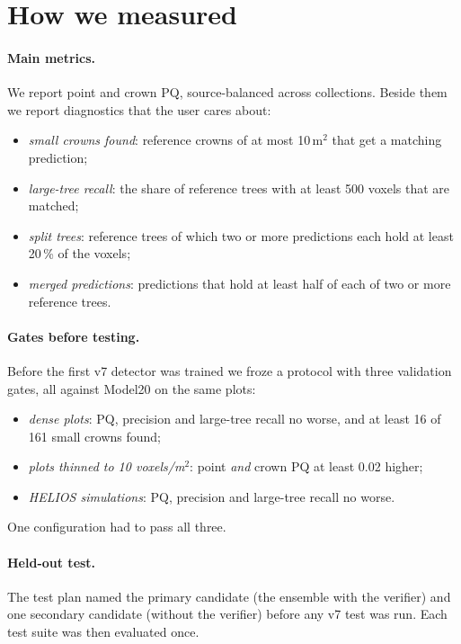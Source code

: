 \documentclass[11pt,a4paper]{article}
\newcommand{\sqm}{m$^2$}
\newcommand{\vpsm}{voxels/m$^2$}
\begin{document}
\section{How we measured}
\label{sec:protocol}

\paragraph{Main metrics.} We report point and crown PQ, source-balanced across collections. Beside them we report diagnostics that the user cares about:
\begin{itemize}
  \item \emph{small crowns found}: reference crowns of at most 10\,\sqm{} that get a matching prediction;
  \item \emph{large-tree recall}: the share of reference trees with at least 500 voxels that are matched;
  \item \emph{split trees}: reference trees of which two or more predictions each hold at least 20\,\% of the voxels;
  \item \emph{merged predictions}: predictions that hold at least half of each of two or more reference trees.
\end{itemize}

\paragraph{Gates before testing.} Before the first v7 detector was trained we froze a protocol with three validation gates, all against Model20 on the same plots:
\begin{itemize}
  \item \emph{dense plots}: PQ, precision and large-tree recall no worse, and at least 16 of 161 small crowns found;
  \item \emph{plots thinned to 10 \vpsm}: point \emph{and} crown PQ at least 0.02 higher;
  \item \emph{HELIOS simulations}: PQ, precision and large-tree recall no worse.
\end{itemize}
One configuration had to pass all three.

\paragraph{Held-out test.} The test plan named the primary candidate (the ensemble with the verifier) and one secondary candidate (without the verifier) before any v7 test was run. Each test suite was then evaluated once.
\end{document}
